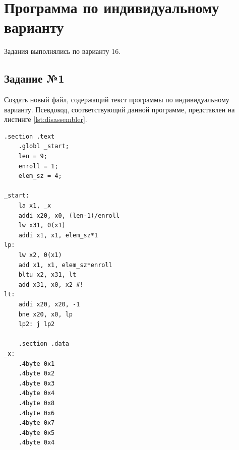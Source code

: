 \chapter{\textbf{Программа по индивидуальному варианту}}
Задания выполнялись по варианту 16.

\section{\textbf{Задание №1}}
Создать новый файл, содержащий текст программы по индивидуальному варианту. Псевдокод, соответствующий данной программе, представлен на листинге \ref{lst:disassembler}.

\begin{lstlisting}[label=lst:disassembler,caption=Исходный текст исследуемой программы]
	.section .text
	.globl _start;
	len = 9;
	enroll = 1;
	elem_sz = 4;
	
_start:
	la x1, _x
	addi x20, x0, (len-1)/enroll
	lw x31, 0(x1)
	addi x1, x1, elem_sz*1
lp:
	lw x2, 0(x1)
	add x1, x1, elem_sz*enroll
	bltu x2, x31, lt
	add x31, x0, x2 #!
lt:
	addi x20, x20, -1
	bne x20, x0, lp
	lp2: j lp2
	
	.section .data
_x:     
	.4byte 0x1
	.4byte 0x2
	.4byte 0x3
	.4byte 0x4
	.4byte 0x8
	.4byte 0x6
	.4byte 0x7
	.4byte 0x5
	.4byte 0x4
\end{lstlisting}

